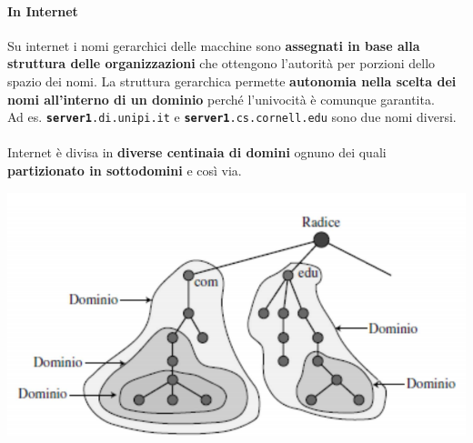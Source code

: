 \documentclass[10pt]{article}
\begin{document}
\paragraph{In Internet} Su internet i nomi gerarchici delle macchine sono \textbf{assegnati in base alla struttura delle organizzazioni} che ottengono l'autorità per porzioni dello spazio dei nomi. La struttura gerarchica permette \textbf{autonomia nella scelta dei nomi all'interno di un dominio} perché l'univocità è comunque garantita.\\
Ad es. \texttt{\textbf{server1}.di.unipi.it} e \texttt{\textbf{server1}.cs.cornell.edu} sono due nomi diversi.\\\\
Internet è divisa in \textbf{diverse centinaia di domini} ognuno dei quali \textbf{partizionato in sottodomini} e così via.
\begin{center}
\includegraphics[scale=0.7]{domini.png}
\end{center}
\pagebreak
\end{document}
